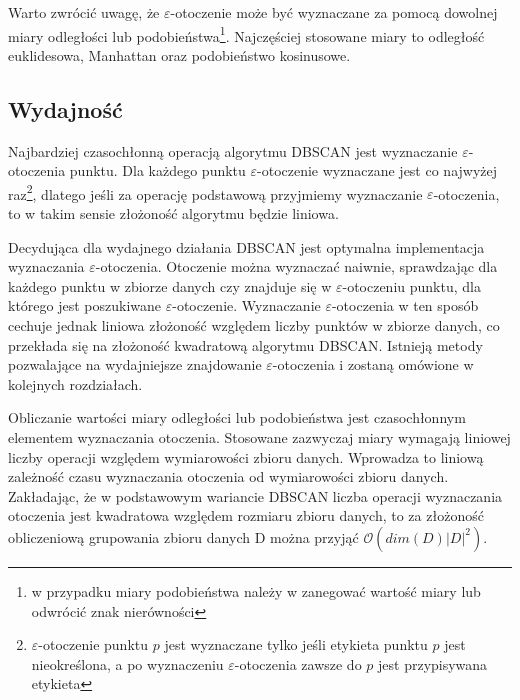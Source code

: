 Warto zwrócić uwagę, że $ \varepsilon $-otoczenie może być wyznaczane za pomocą dowolnej miary odległości lub podobieństwa\footnote{w przypadku miary podobieństwa należy w  zanegować wartość miary lub odwrócić znak nierówności}. Najczęściej stosowane miary to odległość euklidesowa, Manhattan oraz podobieństwo kosinusowe.

\subsection{Wydajność}
Najbardziej czasochłonną operacją algorytmu DBSCAN jest wyznaczanie $ \varepsilon $-otoczenia punktu. Dla każdego punktu $ \varepsilon $-otoczenie wyznaczane jest co najwyżej raz\footnote{$ \varepsilon $-otoczenie punktu $ p $ jest wyznaczane tylko jeśli etykieta punktu $ p $ jest nieokreślona, a  po wyznaczeniu $ \varepsilon $-otoczenia zawsze do $ p $ jest przypisywana etykieta}, dlatego jeśli za operację podstawową przyjmiemy wyznaczanie $ \varepsilon $-otoczenia, to w takim sensie złożoność algorytmu będzie liniowa.

Decydująca dla wydajnego działania DBSCAN jest optymalna implementacja wyznaczania $ \varepsilon $-otoczenia. Otoczenie można wyznaczać naiwnie, sprawdzając dla każdego punktu w zbiorze danych czy znajduje się w $ \varepsilon $-otoczeniu punktu, dla którego jest poszukiwane $ \varepsilon $-otoczenie. Wyznaczanie $ \varepsilon $-otoczenia w ten sposób cechuje jednak liniowa złożoność względem liczby punktów w zbiorze danych, co przekłada się na złożoność kwadratową algorytmu DBSCAN. Istnieją metody pozwalające na wydajniejsze znajdowanie $ \varepsilon $-otoczenia i zostaną omówione w kolejnych rozdziałach.

Obliczanie wartości miary odległości lub podobieństwa jest czasochłonnym elementem wyznaczania otoczenia. Stosowane zazwyczaj miary wymagają liniowej liczby operacji względem wymiarowości zbioru danych. Wprowadza to liniową zależność czasu wyznaczania otoczenia od wymiarowości zbioru danych. Zakładając, że w podstawowym wariancie DBSCAN liczba operacji wyznaczania otoczenia jest kwadratowa względem rozmiaru zbioru danych, to za złożoność obliczeniową grupowania zbioru danych D można przyjąć $ \mathcal{O}(dim(D)|D|^2) $.

